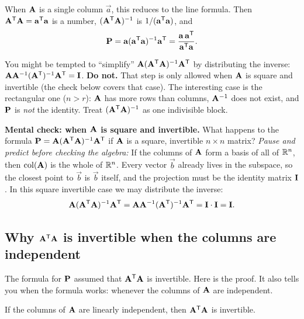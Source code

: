 When $\mathbf{A}$ is a single column $\vec{a}$, this reduces to the line formula. Then
$\mathbf{A}^{\mathsf{T}}\mathbf{A}=\mathbf{a}^{\mathsf{T}}\mathbf{a}$ is a number, $(\mathbf{A}^{\mathsf{T}}\mathbf{A})^{-1}$ is
$1/(\mathbf{a}^{\mathsf{T}}\mathbf{a})$, and
\[
  \mathbf{P}=\mathbf{a}(\mathbf{a}^{\mathsf{T}}\mathbf{a})^{-1}\mathbf{a}^{\mathsf{T}} = \frac{\mathbf{a}\,\mathbf{a}^{\mathsf{T}}}{\mathbf{a}^{\mathsf{T}}\mathbf{a}}.
\]

\begin{trapbox}
You might be tempted to ``simplify''
$\mathbf{A}(\mathbf{A}^{\mathsf{T}}\mathbf{A})^{-1}\mathbf{A}^{\mathsf{T}}$ by distributing the inverse:
$\mathbf{A}\mathbf{A}^{-1}(\mathbf{A}^{\mathsf{T}})^{-1}\mathbf{A}^{\mathsf{T}} = \mathbf{I}$. \textbf{Do not.} That step is only allowed
when $\mathbf{A}$ is square and invertible (the check below covers that case). The interesting case is
the rectangular one ($n>r$): $\mathbf{A}$ has more rows than columns, $\mathbf{A}^{-1}$ does not exist,
and $\mathbf{P}$ is \emph{not} the identity. Treat $(\mathbf{A}^{\mathsf{T}}\mathbf{A})^{-1}$ as one indivisible block.
\end{trapbox}

\begin{recoverybox}
\textbf{Mental check: when $\mathbf{A}$ is square and invertible.} What happens to the formula
$\mathbf{P} = \mathbf{A}(\mathbf{A}^{\mathsf{T}}\mathbf{A})^{-1}\mathbf{A}^{\mathsf{T}}$ if $\mathbf{A}$ is a square, invertible $n\times n$ matrix?
\emph{Pause and predict before checking the algebra:} If the columns of $\mathbf{A}$ form a basis of all of
$\mathbb{R}^n$, then $\operatorname{col}(\mathbf{A})$ is the whole of $\mathbb{R}^n$. Every vector $\vec{b}$ already lives in the
subspace, so the closest point to $\vec{b}$ is $\vec{b}$ itself, and the projection must be the
identity matrix $\mathbf{I}$. In this square invertible case we may distribute the inverse:
\[
  \mathbf{A}(\mathbf{A}^{\mathsf{T}}\mathbf{A})^{-1}\mathbf{A}^{\mathsf{T}} = \mathbf{A}\mathbf{A}^{-1}(\mathbf{A}^{\mathsf{T}})^{-1}\mathbf{A}^{\mathsf{T}}
  = \mathbf{I}\cdot\mathbf{I} = \mathbf{I}.
\]
\end{recoverybox}

\subsection{Why $\mathbf{A}^{\mathsf{T}}\mathbf{A}$ is invertible when the columns are independent}

The formula for $\mathbf{P}$ assumed that $\mathbf{A}^{\mathsf{T}}\mathbf{A}$ is invertible. Here is the proof. It also
tells you when the formula works: whenever the columns of $\mathbf{A}$ are independent.

\begin{lemma}\label{ch18:ata-invertible}
If the columns of $\mathbf{A}$ are linearly independent, then $\mathbf{A}^{\mathsf{T}}\mathbf{A}$ is invertible.
\end{lemma}

